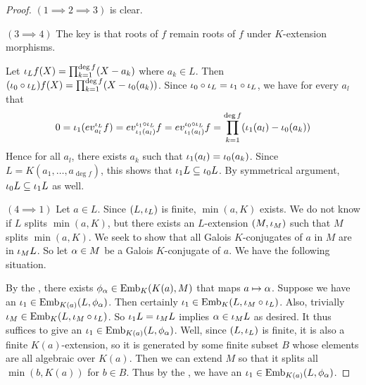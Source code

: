 \documentclass[main.tex]{subfiles}
\begin{document}
\begin{proof} $(1 \implies 2 \implies 3)$ is clear. 

  $(3 \implies 4)$ The key is that roots of $f$ remain roots of $f$
  under $K$-extension morphisms. 

  Let $\iota_L f(X) = \prod_{k = 1}^{\deg f} (X - a_k)$
  where $a_k \in L$.
  Then $(\iota_0 \circ \iota_L) f(X) = \prod_{k = 1}^{\deg f} (X - \iota_0(a_k)) $. 
  Since $\iota_0 \circ \iota_L = \iota_1 \circ \iota_L$, 
  we have for every $a_l$ that \[
    0 = \iota_1 (ev_{a_l}^{\iota_L} f) 
    = ev_{\iota_1(a_l)}^{\iota_1 \circ \iota_L} f
    = ev_{\iota_1(a_l)}^{\iota_0 \circ \iota_L} f
    = \prod_{k = 1}^{\deg f} (\iota_1(a_l) - \iota_0(a_k))
  \] 
  Hence for all $a_l$, 
  there exists $a_k$ such that $\iota_1(a_l) = \iota_0(a_k)$.
  Since $L = K(a_1,\dots,a_{\deg f})$, 
  this shows that $\iota_1 L \subseteq \iota_0 L$.
  By symmetrical argument, $\iota_0 L \subseteq \iota_1 L$ as well. 

  $(4 \implies 1)$ Let $a \in L$. 
  Since $(L,\iota_L)$ is finite, $\min(a,K)$ exists.
  We do not know if $L$ splits $\min(a,K)$,
  but there exists an $L$-extension $(M,\iota_M)$ such that 
  $M$ splits $\min(a,K)$.
  We seek to show that all Galois $K$-conjugates of $a$ in $M$ are in $\iota_M L$.
  So let $\alpha \in M$ be a Galois $K$-conjugate of $a$. 
  We have the following situation. 
  \begin{figure} [H]
    \centering
  \end{figure}
  By the , 
  there exists $\phi_\alpha \in \mathrm{Emb}_{K}(K(a), M)$
  that maps $a \mapsto \alpha$. 
  Suppose we have an $\iota_1 \in \mathrm{Emb}_{K(a)}(L, \phi_\alpha)$.
  Then certainly $\iota_1 \in \mathrm{Emb}_{K}(L, \iota_M \circ \iota_L)$. 
  Also, trivially $\iota_M \in \mathrm{Emb}_{K}(L, \iota_M \circ \iota_L)$. 
  So $\iota_1 L = \iota_M L$ implies $\alpha \in \iota_M L$ as desired. 
  It thus suffices to give an $\iota_1 \in \mathrm{Emb}_{K(a)}(L, \phi_\alpha)$. 
  Well, since $(L,\iota_L)$ is finite, it is also a finite $K(a)$-extension, 
  so it is generated by some finite subset $B$
  whose elements are all algebraic over $K(a)$. 
  Then we can extend $M$ so that it splits all $\min(b,K(a))$ for $b \in B$. 
  Thus by the , 
  we have an $\iota_1 \in \mathrm{Emb}_{K(a)}(L, \phi_\alpha)$. 
\end{proof}
\end{document}
